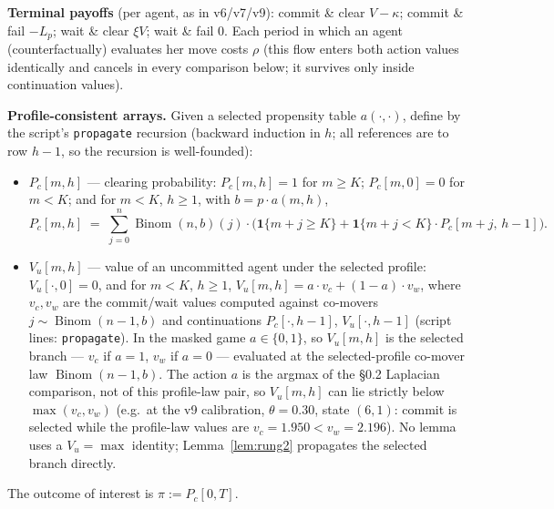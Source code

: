 \medskip
\noindent\textbf{Terminal payoffs} (per agent, as in v6/v7/v9): commit \& clear $V - \kappa$; commit \& fail $-L_p$; wait \& clear $\xi V$; wait \& fail $0$. Each period in which an agent (counterfactually) evaluates her move costs $\rho$ (this flow enters both action values identically and cancels in every comparison below; it survives only inside continuation values).

\medskip
\noindent\textbf{Profile-consistent arrays.} Given a selected propensity table $a(\cdot,\cdot)$, define by the script's \texttt{propagate} recursion (backward induction in $h$; all references are to row $h-1$, so the recursion is well-founded):
\begin{itemize}
\item $P_c[m,h]$ --- clearing probability: $P_c[m,h] = 1$ for $m \ge K$; $P_c[m,0] = 0$ for $m < K$; and for $m < K$, $h \ge 1$, with $b = p \cdot a(m,h)$,
\[
P_c[m,h] \;=\; \sum_{j=0}^{n} \operatorname{Binom}(n,b)(j) \cdot \bigl( \mathbf{1}\{m+j \ge K\} + \mathbf{1}\{m+j < K\} \cdot P_c[m+j,\, h-1] \bigr).
\]
\item $V_u[m,h]$ --- value of an uncommitted agent under the selected profile: $V_u[\cdot,0] = 0$, and for $m < K$, $h \ge 1$, $V_u[m,h] = a \cdot v_c + (1-a) \cdot v_w$, where $v_c, v_w$ are the commit/wait values computed against co-movers $j \sim \operatorname{Binom}(n-1, b)$ and continuations $P_c[\cdot,h-1]$, $V_u[\cdot,h-1]$ (script lines: \texttt{propagate}). In the masked game $a \in \{0,1\}$, so $V_u[m,h]$ is the selected branch --- $v_c$ if $a = 1$, $v_w$ if $a = 0$ --- evaluated at the selected-profile co-mover law $\operatorname{Binom}(n-1,b)$. The action $a$ is the argmax of the \S 0.2 Laplacian comparison, not of this profile-law pair, so $V_u[m,h]$ can lie strictly below $\max(v_c, v_w)$ (e.g.\ at the v9 calibration, $\theta = 0.30$, state $(6,1)$: commit is selected while the profile-law values are $v_c = 1.950 < v_w = 2.196$). No lemma uses a $V_u = \max$ identity; Lemma~\ref{lem:rung2} propagates the selected branch directly.
\end{itemize}
The outcome of interest is $\pi := P_c[0,T]$.


